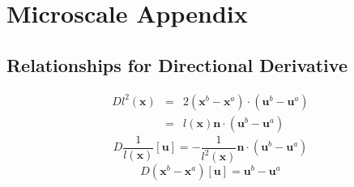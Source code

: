 \chapter{Microscale Appendix}
\section{Relationships for Directional Derivative}
\label{app:relationships}
\begin{eqnarray}
Dl^2(\textbf{x}) &=& 2 (\textbf{x}^b - \textbf{x}^a) \cdot (\textbf{u}^b - \textbf{u}^a) \nonumber\\
&=& l(\textbf{x})\textbf{n} \cdot (\textbf{u}^b - \textbf{u}^a) 
\label{Dl^2}
\end{eqnarray}
%
\begin{equation}
D\frac{1}{l(\textbf{x})}[\textbf{u}] = -\frac{1}{l^{2}(\textbf{x})}\textbf{n} \cdot (\textbf{u}^b - \textbf{u}^a)
\label{Dl^-1}
\end{equation}
%
\begin{equation}
D(\textbf{x}^b - \textbf{x}^a)[\textbf{u}] = \textbf{u}^b - \textbf{u}^a
\label{D(xb-xa)}
\end{equation}
%